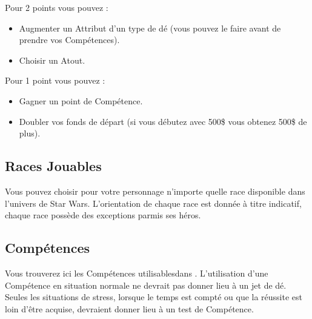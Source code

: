 Pour 2 points vous pouvez :
\begin{itemize}
    \item Augmenter un Attribut d’un type de dé (vous pouvez le faire avant de prendre vos Compétences).
    \item Choisir un Atout.
\end{itemize}

Pour 1 point vous pouvez :
\begin{itemize}
    \item Gagner un point de Compétence.
    \item Doubler vos fonds de départ (si vous débutez avec 500\$ vous obtenez 500\$ de plus).
\end{itemize}

\subsection{Races Jouables}
Vous pouvez choisir pour votre personnage n’importe quelle race disponible dans l'univers de Star Wars. L'orientation de chaque race est donnée à titre indicatif, chaque race possède des exceptions parmis ses héros.













%
%
\newpage

\subsection{Compétences}
Vous trouverez ici les Compétences utilisables\footnotemark[1] dans \swfe. L’utilisation d’une Compétence en situation normale ne devrait pas donner lieu à un jet de dé. Seules les situations de stress, lorsque le temps est compté ou que la réussite est loin d’être acquise, devraient donner lieu à un test de Compétence.

